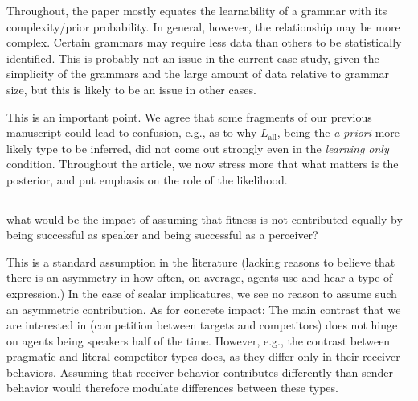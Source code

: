 \documentclass[12pt,a4paper]{article}
\begin{document}
\begin{mdframed}[backgroundcolor=gray!25,linecolor=gray!25,frametitle= Reviewer \thereviewerCounter~comment \thereviewerCommentCounter \hfill ~~({\it Learnability})]
%
Throughout, the paper mostly equates the learnability of a grammar with its complexity/prior probability. In general, however, the relationship may be more complex. Certain grammars may require less data than others to be statistically identified. This is probably not an issue in the current case study, given the simplicity of the grammars and the large amount of data relative to grammar size, but this is likely to be an issue in other cases.

%
\end{mdframed}

This is an important point. We agree that some fragments of our previous manuscript could lead to confusion, e.g., as to why $L_{\text{all}}$, being the {\em a priori} more likely type to be inferred, did not come out strongly even in the {\em learning only} condition. Throughout the article, we now stress more that what matters is the posterior, and put emphasis on the role of the likelihood.


%


\noindent\rule{\textwidth}{1pt}

\begin{mdframed}[backgroundcolor=gray!25,linecolor=gray!25,frametitle= Reviewer \thereviewerCounter~comment \thereviewerCommentCounter \hfill ~~({\it expected utility})]
%
what would be the impact of assuming that fitness is not contributed equally by being successful as speaker and being successful as a perceiver?

%
\end{mdframed}

This is a standard assumption in the literature (lacking reasons to believe that there is an asymmetry in how often, on average, agents use and hear a type of expression.) In the case of scalar implicatures, we see no reason to assume such an asymmetric contribution. As for concrete impact: The main contrast that we are interested in (competition between targets and competitors) does not hinge on agents being speakers half of the time. However, e.g., the contrast between pragmatic and literal competitor types does, as they differ only in their receiver behaviors. Assuming that receiver behavior contributes differently than sender behavior would therefore modulate differences between these types.
\end{document}

